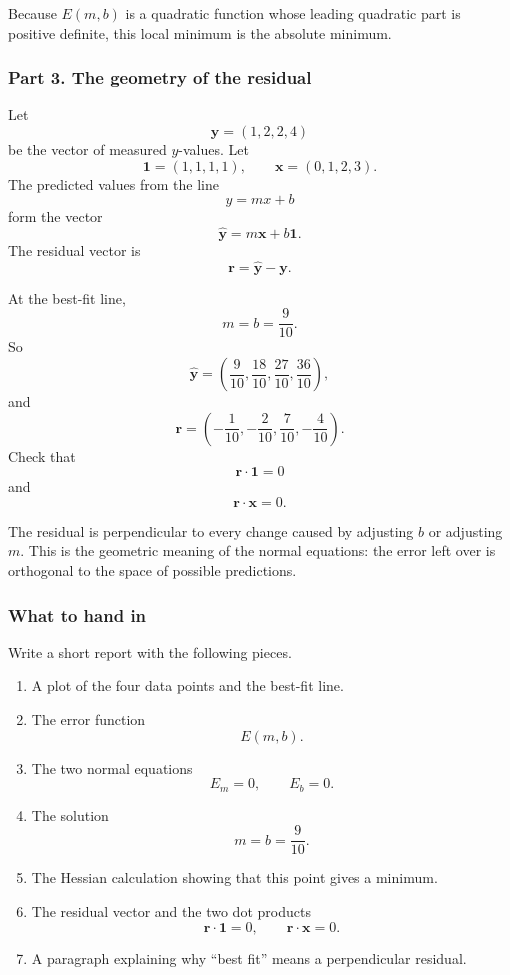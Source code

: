 Because \(E(m,b)\) is a quadratic function whose leading quadratic part is positive
definite, this local minimum is the absolute minimum.

\subsubsection*{Part 3. The geometry of the residual}

Let
\[
    \mathbf y=(1,2,2,4)
\]
be the vector of measured \(y\)-values.  Let
\[
    \mathbf 1=(1,1,1,1),
    \qquad
    \mathbf x=(0,1,2,3).
\]
The predicted values from the line
\[
    y=mx+b
\]
form the vector
\[
    \widehat{\mathbf y}=m\mathbf x+b\mathbf 1.
\]
The residual vector is
\[
    \mathbf r=\widehat{\mathbf y}-\mathbf y.
\]

At the best-fit line,
\[
    m=b=\frac9{10}.
\]
So
\[
    \widehat{\mathbf y}
    =
    \left(\frac9{10},\frac{18}{10},\frac{27}{10},\frac{36}{10}\right),
\]
and
\[
    \mathbf r
    =
    \left(-\frac1{10},-\frac2{10},\frac7{10},-\frac4{10}\right).
\]
Check that
\[
\boxed{
    \mathbf r\cdot \mathbf 1=0
}
\]
and
\[
\boxed{
    \mathbf r\cdot \mathbf x=0.
}
\]

The residual is perpendicular to every change caused by adjusting \(b\) or adjusting
\(m\).  This is the geometric meaning of the normal equations: the error left over is
orthogonal to the space of possible predictions.

\subsubsection*{What to hand in}

Write a short report with the following pieces.

\begin{enumerate}
\item A plot of the four data points and the best-fit line.

\item The error function
\[
    E(m,b).
\]

\item The two normal equations
\[
    E_m=0,\qquad E_b=0.
\]

\item The solution
\[
    m=b=\frac9{10}.
\]

\item The Hessian calculation showing that this point gives a minimum.

\item The residual vector and the two dot products
\[
    \mathbf r\cdot\mathbf 1=0,
    \qquad
    \mathbf r\cdot\mathbf x=0.
\]

\item A paragraph explaining why ``best fit'' means a perpendicular residual.
\end{enumerate}

